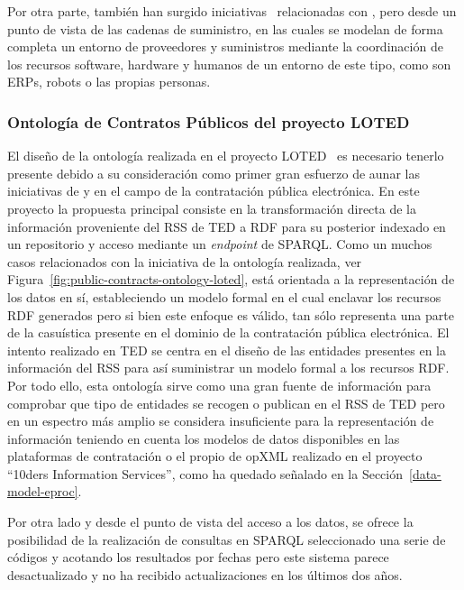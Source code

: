 Por otra parte, también han surgido iniciativas~\cite{DBLP:journals/tcci/Alor-HernandezAJPRMBG10} relacionadas con \eproc, pero desde un punto de vista
de las cadenas de suministro, en las cuales se modelan de forma completa un entorno de proveedores y suministros mediante la coordinación
de los recursos software, hardware y humanos de un entorno de este tipo, como son \gls{ERP}s, robots o las propias personas. 

\subsubsection{Ontología de Contratos Públicos del proyecto LOTED}
El diseño de la ontología realizada en el proyecto LOTED~\cite{loted-project} es necesario tenerlo presente debido a su consideración 
como primer gran esfuerzo de aunar las iniciativas de \linkeddata y \opendata en el campo de la contratación 
pública electrónica. En este proyecto la propuesta principal consiste en la transformación directa 
de la información proveniente del \gls{RSS} de \gls{TED} a \gls{RDF} para su posterior indexado en un repositorio y acceso 
mediante un \textit{endpoint} de \gls{SPARQL}. Como un muchos casos relacionados con la iniciativa 
de \linkeddata la ontología realizada, ver Figura~\ref{fig:public-contracts-ontology-loted}, está orientada a la representación de los datos en sí, estableciendo 
un modelo formal en el cual enclavar los recursos RDF generados pero si bien este enfoque es válido, tan sólo 
representa una parte de la casuística presente en el dominio de la contratación pública electrónica. El intento 
realizado en TED se centra en el diseño de las entidades presentes en la información del RSS para así suministrar 
un modelo formal a los recursos RDF. Por todo ello, esta ontología sirve como una gran fuente de información 
para comprobar que tipo de entidades se recogen o publican en el RSS de TED pero en un espectro más amplio 
se considera insuficiente para la representación de información teniendo en cuenta los modelos de datos 
disponibles en las plataformas de contratación o el propio de \gls{opXML} realizado en el proyecto ``10ders Information 
Services'', como ha quedado señalado en la Sección~\ref{data-model-eproc}. 

Por otra lado y desde el punto de vista del acceso a los datos, se ofrece la posibilidad de la realización 
de consultas en SPARQL seleccionado una serie de códigos y acotando los resultados por fechas pero este sistema 
parece desactualizado y no ha recibido actualizaciones en los últimos dos años. 

